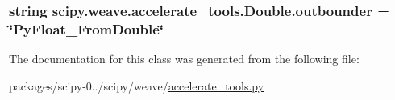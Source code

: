 \subsubsection[{outbounder}]{\setlength{\rightskip}{0pt plus 5cm}string scipy.\+weave.\+accelerate\+\_\+tools.\+Double.\+outbounder = \char`\"{}Py\+Float\+\_\+\+From\+Double\char`\"{}\hspace{0.3cm}{\ttfamily [static]}}\label{classscipy_1_1weave_1_1accelerate__tools_1_1Double_a1544efbdbea3e7bfe0b14301371ca7a0}


The documentation for this class was generated from the following file\+:\begin{DoxyCompactItemize}
\item 
packages/scipy-\/0../scipy/weave/\hyperlink{accelerate__tools_8py}{accelerate\+\_\+tools.\+py}\end{DoxyCompactItemize}
